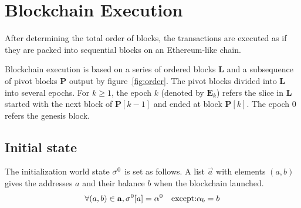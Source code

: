 

\section{Blockchain Execution}

After determining the total order of blocks, the transactions are executed as if they are packed into sequential blocks on an Ethereum-like chain. 

Blockchain execution is based on a series of ordered blocks $\mathbf{L}$ and a subsequence of pivot blocks $\mathbf{P}$ output by figure~\ref{fig:order}. 
%
The pivot blocks divided into $\mathbf{L}$ into several epochs.  For $k\ge 1$, the epoch $k$ (denoted by $\mathbf{E}_k$) refers the slice in $\mathbf{L}$ started with the next block of $\mathbf{P}[k-1]$ and ended at block $\mathbf{P}[k]$. The epoch 0 refers the genesis block. 


\subsection{Initial state}

The initialization world state $\mathbf{\sigma}^0$ is set as follows. A list $\vec{a}$ with elements $(a,b)$ gives the addresses $a$ and their balance $b$ when the \name blockchain launched.  
\begin{align}
	\forall (a,b)\in \mathbf{a}, \mathbf{\sigma}^0[a]= \mathbf{\alpha}^0 \quad \mbox{except:} \mathbf{\alpha}_b=b 
\end{align}



